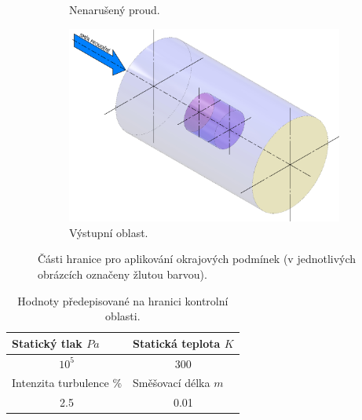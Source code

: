 \begin{figure}[ht!]
\begin{subfigure}{0.3\textwidth}
                             \caption{Nenarušený proud.}
                             \label{fig:farfield}
                         \end{subfigure}
					\begin{subfigure}{0.3\textwidth}
                             \centering
                             \captionsetup{width=.9\linewidth}
                             \includegraphics[width=\textwidth]{300_VYPOCETNI_MODEL/op-outlet.png}
                             \caption{Výstupní oblast.}
                             \label{fig:outlet}
                         \end{subfigure}
                    \caption{Části hranice pro aplikování okrajových podmínek (v jednotlivých obrázcích označeny žlutou barvou).}
                    \label{fig:okrajove-podminky}
         \end{figure}

         \begin{table}[ht!]
            \centering
            \begin{tabular}{l|l}
                Statický tlak $\unit{Pa}$       & Statická teplota $\unit{K}$ \\ \hline
                \multicolumn{1}{c|}{$10^{5}$}    & \multicolumn{1}{c}{300}     \\ \hline
                Intenzita turbulence $\unit{\%}$ & Směšovací délka $\unit{m}$  \\ \hline
                \multicolumn{1}{c|}{2.5}         & \multicolumn{1}{c}{0.01}   
            \end{tabular}%
            \caption{Hodnoty předepisované na hranici kontrolní oblasti.}
            \label{tab:spolecne-op}
        \end{table}

